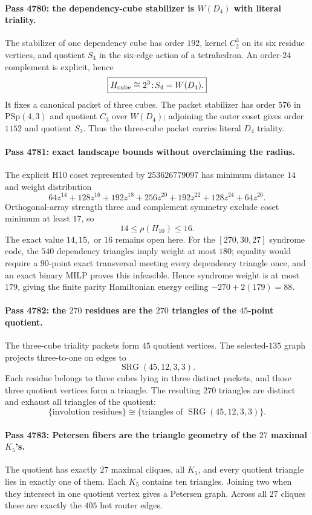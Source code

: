 \paragraph{Pass 4780: the dependency-cube stabilizer is $W(D_4)$ with literal triality.}
The stabilizer of one dependency cube has order $192$, kernel $C_2^3$ on its six residue vertices, and quotient $S_4$ in the six-edge action of a tetrahedron.  An order-$24$ complement is explicit, hence
\[
 \boxed{H_{\rm cube}\cong 2^3\!:\!S_4=W(D_4).}
\]
It fixes a canonical packet of three cubes.  The packet stabilizer has order $576$ in $\mathrm{PSp}(4,3)$ and quotient $C_3$ over $W(D_4)$; adjoining the outer coset gives order $1152$ and quotient $S_3$.  Thus the three-cube packet carries literal $D_4$ triality.

\paragraph{Pass 4781: exact landscape bounds without overclaiming the radius.}
The explicit H10 coset represented by $253626779097$ has minimum distance $14$ and weight distribution
\[
 64z^{14}+128z^{16}+192z^{18}+256z^{20}+192z^{22}+128z^{24}+64z^{26}.
\]
Orthogonal-array strength three and complement symmetry exclude coset minimum at least $17$, so
\[
 \boxed{14\le\rho(H_{10})\le16}.
\]
The exact value $14,15,$ or $16$ remains open here.  For the $[270,30,27]$ syndrome code, the $540$ dependency triangles imply weight at most $180$; equality would require a $90$-point exact transversal meeting every dependency triangle once, and an exact binary MILP proves this infeasible.  Hence syndrome weight is at most $179$, giving the finite parity Hamiltonian energy ceiling $-270+2(179)=88$.

\paragraph{Pass 4782: the $270$ residues are the $270$ triangles of the $45$-point quotient.}
The three-cube triality packets form $45$ quotient vertices.  The selected-$135$ graph projects three-to-one on edges to
\[
 \operatorname{SRG}(45,12,3,3).
\]
Each residue belongs to three cubes lying in three distinct packets, and those three quotient vertices form a triangle.  The resulting $270$ triangles are distinct and exhaust all triangles of the quotient:
\[
 \boxed{\{\text{involution residues}\}\cong\{\text{triangles of }\operatorname{SRG}(45,12,3,3)\}.}
\]

\paragraph{Pass 4783: Petersen fibers are the triangle geometry of the $27$ maximal $K_5$'s.}
The quotient has exactly $27$ maximal cliques, all $K_5$, and every quotient triangle lies in exactly one of them.  Each $K_5$ contains ten triangles.  Joining two when they intersect in one quotient vertex gives a Petersen graph.  Across all $27$ cliques these are exactly the $405$ hot router edges.

